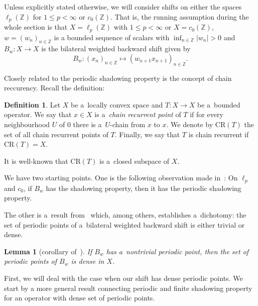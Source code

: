 \documentclass[11pt,a4paper]{amsart}
\newtheorem{lemma}[theorem]{Lemma}
\theoremstyle{definition}
\newtheorem{definition}[theorem]{Definition}
\newcommand{\Z}{\mathbb{Z}}
\newcommand{\abs}[1]{\left| #1 \right|}
\newcommand{\CR}{\mathrm{CR}}
\begin{document}
	Unless explicitly stated otherwise, we will consider shifts on either the spaces $\ell_p(\Z)$ for $1 \leq p < \infty$ or $c_0(\Z)$. That is, the running assumption during the whole section is that \(X = \ell_p(\Z)\) with \(1 \leq p < \infty\) or \(X = c_0(\Z)\), \(w = (w_n)_{n \in \Z}\) is a bounded sequence of scalars with \(\inf_{n \in \Z}\abs{w_n} > 0\) and $B_w: X \to X$ is the bilateral weighted backward shift given by
	\begin{equation*}
		B_w: (x_n)_{n \in \Z} \mapsto (w_{n+1}x_{n+1})_{n \in \Z}.
	\end{equation*} 
	
	Closely related to the periodic shadowing property is the concept of chain reccurency. Recall the definition:
	\begin{definition}
		Let $X$ be a~locally convex space and $T: X \to X$ be a~bounded operator. We say that $x \in X$ is a~\emph{chain recurrent point} of $T$ if for every neighbourhood $U$ of $0$ there is a~$U$-chain from $x$ to $x$. We denote by $\CR(T)$ the set of all chain recurrent points of $T$. Finally, we say that $T$ is chain recurrent if $\CR(T) = X$.
	\end{definition}
	It is well-known that $\CR(T)$ is a~closed subspace of $X$.
	
	We have two starting points. One is the following observation made in~\cite{Shadowing_and_chain_rec}: On $\ell_p$ and $c_0$, if $B_w$ has the shadowing property, then it has the periodic shadowing property.
	
	The other is a~result from~\cite{Hyperc_chaotic_weight_shifts} which, among others, establishes a~dichotomy: the set of periodic points of a~bilateral weighted backward shift is either trivial or dense.
	
	\begin{lemma}[{corollary of~\cite[Theorem 9]{Hyperc_chaotic_weight_shifts}}]
		\label{periodic points are dense}
		If \(B_w\) has a~nontrivial periodic point, then the set of periodic points of \(B_w\) is dense in \(X\).
	\end{lemma}
	
	First, we will deal with the case when our shift has dense periodic points. We start by a more general result connecting periodic and finite shadowing property for an operator with dense set of periodic points.
	
\end{document}
